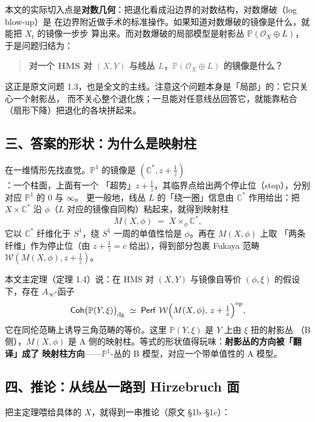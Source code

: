 \documentclass[11pt,a4paper]{article}
\DeclareMathOperator{\Coh}{\mathsf{Coh}}
\DeclareMathOperator{\Perf}{\mathsf{Perf}}
\theoremstyle{cnth}
\begin{document}
本文的实际切入点是\textbf{对数几何}：把退化看成沿边界的对数结构，对数爆破（log blow-up）是
在边界附近做手术的标准操作。如果知道对数爆破的镜像是什么，就能把 $X_t$ 的镜像一步步
算出来。而对数爆破的局部模型是射影丛 $\mathbb{P}(\mathcal{O}_X\oplus L)$，于是问题归结为：

\begin{quote}
\bfseries 对一个 HMS 对 $(X,Y)$ 与线丛 $L$，$\mathbb{P}(\mathcal{O}_X\oplus L)$ 的镜像是什么？
\end{quote}

这正是原文问题 1.3，也是全文的主线。注意这个问题本身是「局部」的：它只关心一个射影丛，
而不关心整个退化族；一旦能对任意线丛回答它，就能靠粘合（扇形下降）把退化的各块拼起来。

\subsection*{三、答案的形状：为什么是映射柱}

在一维情形先找直觉。$\mathbb{P}^1$ 的镜像是 $(\mathbb{C}^*,z+\frac1z)$：一个柱面，上面有一个
「超势」$z+\frac1z$，其临界点给出两个停止位（stop），分别对应 $\mathbb{P}^1$ 的 $0$ 与 $\infty$。
更一般地，线丛 $L$ 的「绕一圈」信息由 $\mathbb{C}^*$ 作用给出：把 $X\times\mathbb{C}^*$ 沿
$\phi$（$L$ 对应的镜像自同构）粘起来，就得到映射柱
\[
  M(X,\phi)\;=\;X\times_\phi\mathbb{C}^*,
\]
它以 $\mathbb{C}^*$ 纤维化于 $S^1$，绕 $S^1$ 一周的单值性恰是 $\phi$。再在 $M(X,\phi)$ 上取
「两条纤维」作为停止位（由 $z+\frac1z=c$ 给出），得到部分包裹 Fukaya 范畴
$\mathcal{W}(M(X,\phi),z+\frac1z)$。

本文主定理（定理 1.4）说：在 HMS 对 $(X,Y)$ 与镜像自等价 $(\phi,\xi)$ 的假设下，存在
$A_\infty$-函子
\[
  \Coh\bigl(\mathbb{P}(Y,\xi)\bigr)_{\mathrm{dg}}
  \;\simeq\;
  \Perf\,\mathcal{W}\Bigl(M(X,\phi),\,z+\tfrac1z\Bigr)^{\mathrm{op}},
\]
它在同伦范畴上诱导三角范畴的等价。这里 $\mathbb{P}(Y,\xi)$ 是 $Y$ 上由 $\xi$ 扭的射影丛
（B 侧），$M(X,\phi)$ 是 A 侧的映射柱。等式的形状值得玩味：\textbf{射影丛的方向被「翻译」成了
映射柱方向}——$\mathbb{P}^1$-丛的 B 模型，对应一个带单值性的 A 模型。

\subsection*{四、推论：从线丛一路到 Hirzebruch 面}

把主定理喂给具体的 $X$，就得到一串推论（原文 §1b–§1c）：
\end{document}
